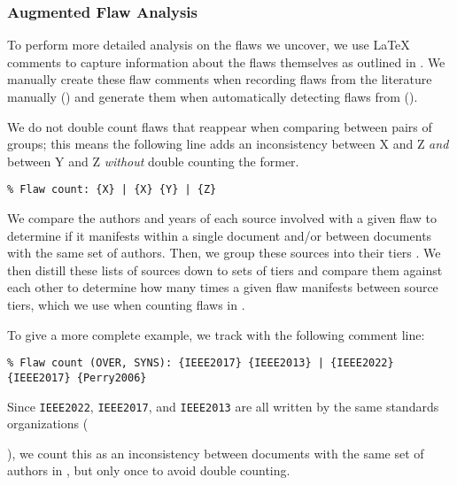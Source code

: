\subsubsection{Augmented Flaw Analysis}\label{aug-flaw-analysis}

To perform more detailed analysis on the flaws we uncover, we use \LaTeX{}
comments to capture information about the flaws themselves as outlined in
. We manually create these flaw comments when recording
flaws from the literature manually () and generate them when
automatically detecting flaws from \ourApproachGlossary{} ().

We do not double count flaws that reappear when comparing between pairs of
groups; this means the following line adds an inconsistency between X and Z
\emph{and} between Y and Z \emph{without} double counting the former.
\begin{displayquote}
    \texttt{\% Flaw count: \{X\} | \{X\} \{Y\} | \{Z\}}
\end{displayquote}

We compare the authors and years of each source involved with a given flaw
to determine if it manifests within a single document and/or between documents
with the same set of authors. Then, we group these sources into their tiers
.
We then distill these lists of sources down to sets of tiers and compare them
against each other to determine how many times a given flaw manifests between
source tiers, which we use when counting flaws in .

To give a more complete example, we track  with the
following comment line:\utd{}
\begin{displayquote}
    \texttt{\% Flaw count (OVER, SYNS): \{IEEE2017\} \{IEEE2013\} | \{IEEE2022\}
        \displayNL{} \{IEEE2017\} \{Perry2006\}}
\end{displayquote}%
Since \texttt{IEEE2022}, \texttt{IEEE2017}, and \texttt{IEEE2013} are all
written by the same standards
organizations (\begin{NoHyper}\citeauthor{IEEE2022}\end{NoHyper}), we count
this as an inconsistency between documents with the same set of authors in
, but only once to avoid double counting.

